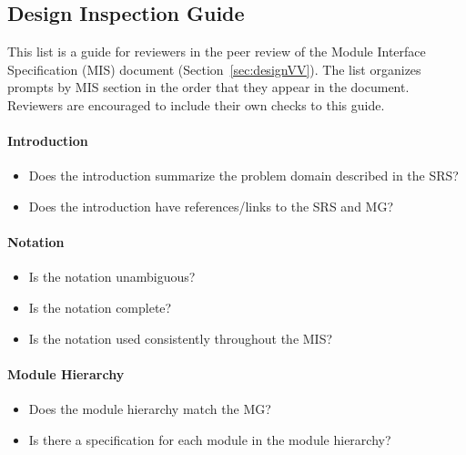 \subsection{Design Inspection Guide}\label{appendix:designInspection}
This list is a guide for reviewers in the peer review of the Module Interface
Specification (MIS) document (Section~\ref{sec:designVV}). The list organizes
prompts by MIS section in the order that they appear in the document. Reviewers
are encouraged to include their own checks to this guide.

\paragraph{Introduction}
\begin{itemize}

    \item Does the introduction summarize the problem domain described in the
    SRS?

    \item Does the introduction have references/links to the SRS and MG?

\end{itemize}

\paragraph{Notation}
\begin{itemize}

    \item Is the notation unambiguous?

    \item Is the notation complete?

    \item Is the notation used consistently throughout the MIS?

\end{itemize}

\paragraph{Module Hierarchy}
\begin{itemize}

    \item Does the module hierarchy match the MG?

    \item Is there a specification for each module in the module hierarchy?

\end{itemize}


